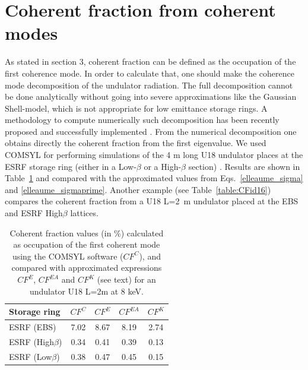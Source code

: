 \documentclass{iucr}              %
\begin{document}
\section{Coherent fraction from coherent modes}

As stated in section 3, coherent fraction can be defined as the occupation of the first coherence mode. In order to calculate that, one should make the coherence mode decomposition of the undulator radiation. The full decomposition cannot be done analytically without going into severe approximations like the Gaussian Shell-model, which is not appropriate for low emittance storage rings. A methodology to compute numerically such decomposition has been recently proposed and successfully implemented \cite{glass2017}. From the numerical decomposition one obtains directly the coherent fraction from the first eigenvalue. We used COMSYL \cite{comsyl} for performing simulations of the 4 m long U18 undulator places at the ESRF storage ring (either in a Low-$\beta$ or a High-$\beta$ section) \cite{glass2017}. Results are shown in Table~\ref{table:CFmark} and compared with the approximated values from Eqs.~\ref{elleaume_sigma} and \ref{elleaume_sigmaprime}. Another example (see Table~\ref{table:CFid16}) compares the coherent fraction from a U18 L=2~m undulator placed at the EBS and ESRF High$\beta$ lattices. 

\begin{table}
\caption{Coherent fraction values (in $\%$) calculated as occupation of the first coherent mode using the COMSYL software ($CF^C$), and compared with approximated expressions $CF^E$, $CF^{EA}$ and $CF^K$ (see text) for an undulator U18 L=2m at 8 keV.}
\begin{tabular}{lcccc}      %
 Storage ring    & $CF^C$       & $CF^{E}$      & $CF^{EA}$ & $CF^K$    \\
\hline
 ESRF (EBS)              & 7.02  & 8.67 & 8.19  & 2.74   \\
 ESRF (High$\beta$)      & 0.34  & 0.41 & 0.39  & 0.13   \\
 ESRF (Low$\beta$)       & 0.38  & 0.47 & 0.45  & 0.15   \\
\end{tabular}
\label{table:CFmark}
\end{table}
\end{document}
